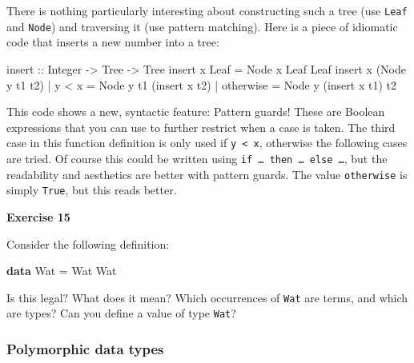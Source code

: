 \documentclass[11pt,
  american,
  DIV13]{article}
\newenvironment{Shaded}{}{}
\newcommand{\DataTypeTok}[1]{\textcolor[rgb]{0.56,0.13,0.00}{#1}}
\newcommand{\FunctionTok}[1]{\textcolor[rgb]{0.02,0.16,0.49}{#1}}
\newcommand{\KeywordTok}[1]{\textcolor[rgb]{0.00,0.44,0.13}{\textbf{#1}}}
\newcommand{\NormalTok}[1]{#1}
\newcommand{\OperatorTok}[1]{\textcolor[rgb]{0.40,0.40,0.40}{#1}}
\newcommand{\OtherTok}[1]{\textcolor[rgb]{0.00,0.44,0.13}{#1}}
\begin{document}
There is nothing particularly interesting about constructing such a tree
(use \texttt{Leaf} and \texttt{Node}) and traversing it (use pattern
matching). Here is a piece of idiomatic code that inserts a new number
into a tree:

\begin{Shaded}
\begin{Highlighting}[]
\OtherTok{insert ::} \DataTypeTok{Integer} \OtherTok{{-}\textgreater{}} \DataTypeTok{Tree} \OtherTok{{-}\textgreater{}} \DataTypeTok{Tree}
\NormalTok{insert x }\DataTypeTok{Leaf} \OtherTok{=} \DataTypeTok{Node}\NormalTok{ x }\DataTypeTok{Leaf} \DataTypeTok{Leaf}
\NormalTok{insert x (}\DataTypeTok{Node}\NormalTok{ y t1 t2)}
    \OperatorTok{|}\NormalTok{ y }\OperatorTok{\textless{}}\NormalTok{ x     }\OtherTok{=} \DataTypeTok{Node}\NormalTok{ y t1 (insert x t2)}
    \OperatorTok{|} \FunctionTok{otherwise} \OtherTok{=} \DataTypeTok{Node}\NormalTok{ y (insert x t1) t2}
\end{Highlighting}
\end{Shaded}

This code shows a new, syntactic feature: Pattern guards! These are
Boolean expressions that you can use to further restrict when a case is
taken. The third case in this function definition is only used if
\texttt{y\ \textless{}\ x}, otherwise the following cases are tried. Of
course this could be written using
\texttt{if\ \ldots{}\ then\ \ldots{}\ else\ \ldots{}}, but the
readability and aesthetics are better with pattern guards. The value
\texttt{otherwise} is simply \texttt{True}, but this reads better.

\textbf{Exercise 15}

Consider the following definition:

\begin{Shaded}
\begin{Highlighting}[]
\KeywordTok{data} \DataTypeTok{Wat} \OtherTok{=} \DataTypeTok{Wat} \DataTypeTok{Wat}
\end{Highlighting}
\end{Shaded}

Is this legal? What does it mean? Which occurrences of \texttt{Wat} are
terms, and which are types? Can you define a value of type \texttt{Wat}?

\hypertarget{polymorphic-data-types}{%
\subsubsection{Polymorphic data types}\label{polymorphic-data-types}}
\end{document}
